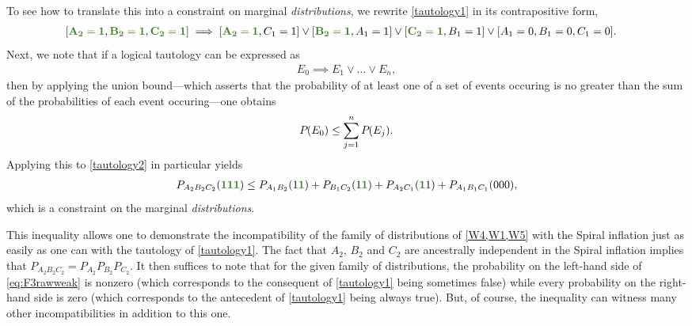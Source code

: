 \documentclass[aps,english,10pt,superscriptaddress,onecolumn,twoside,longbibliography,pra,floatfix,fleqn,nofootinbib]{revtex4-1}%
\newcommand*{\mgreen}[1]{{\color{OliveGreen}{\mathbf{#1}}}}
\theoremstyle{definition}
\newcommand{\p}[2][]{{P_{#1}}\parenths{#2}}
\newcommand{\eql}{=}
\DeclarePairedDelimiter{\parens}{\lparen}{\rparen}
\DeclarePairedDelimiter{\parenths}{\lparen}{\rparen}
\begin{document}
To see how to translate this into a constraint on marginal {\em distributions}, we rewrite \cref{tautology1} in its contrapositive form,
\begin{align}\begin{split}\label{tautology2}
&[\mgreen{A_2 \eql 1} , \mgreen{B_2 \eql 1} , \mgreen{C_2 \eql 1}]  \implies [\mgreen{A_2 \eql 1}, C_1 \eql 1] \lor  [\mgreen{B_2 \eql 1}, A_1 \eql 1] \lor  [\mgreen{C_2 \eql 1}, B_1 \eql 1] \lor  [A_1 \eql 0, B_1 \eql 0, C_1 \eql 0].
\end{split}\end{align}
Next, we note that if a logical tautology can be expressed as
\begin{align}\label{eq:inference}
    E_0 \implies E_1 \lor \ldots \lor E_n,
\end{align}
then by applying the union bound---which asserts that the probability of at least one of a set of events occuring is no greater than the sum of the probabilities of each event occuring---one obtains
\begin{align}\label{eq:possinference}
\p{E_0}\leq \sum\limits_{j=1}^n{\p{E_j}}.
\end{align}
Applying this to \cref{tautology2} in particular yields
\begin{align}\label{eq:F3rawweak}
P_{A_2 B_2 C_2}\parens{\mgreen{1} \mgreen{1} \mgreen{1}} \leq P_{A_1 B_2}\parens{1 \mgreen{1 }}+P_{ B_1 C_2}\parens{ 1 \mgreen{1}}+P_{A_2 C_1}\parens{\mgreen{1 } 1}+P_{A_1 B_1 C_1}\parens{0 0 0},
\end{align}
which is a constraint on the marginal {\em distributions}.
 
This inequality allows one to demonstrate the incompatibility of the family of distributions of \cref{W4,W1,W5} with the Spiral inflation just as easily as one can with the tautology of \cref{tautology1}. The fact that $A_2$, $B_2$ and $C_2$ are ancestrally independent in the Spiral inflation implies that $P_{A_2 B_2 C_2} = P_{A_2} P_{B_2} P_{C_2}$. 
 It then suffices to note that for the given family of distributions, the probability on the left-hand side of \cref{eq:F3rawweak} is nonzero (which corresponds to the consequent of \cref{tautology1} being sometimes false) while every probability on the right-hand side is zero (which corresponds to the antecedent of \cref{tautology1} being always true).  But, of course, the inequality can witness many other incompatibilities in addition to this one.
\end{document}
